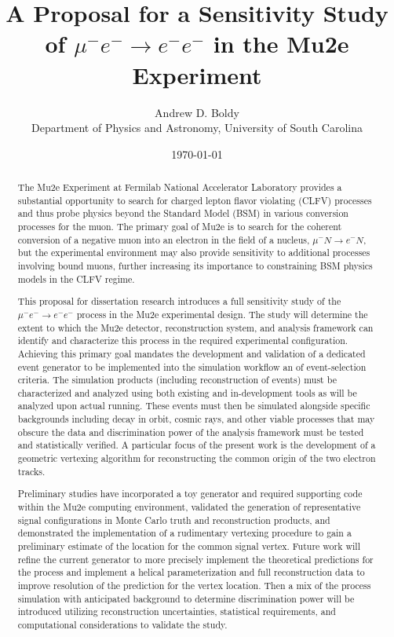 \documentclass[12pt]{article}
\title{A Proposal for a Sensitivity Study of
$\mu^- e^- \rightarrow e^-e^-$ in the Mu2e Experiment}
\author{
Andrew D. Boldy \\
\small Department of Physics and Astronomy, University of South Carolina
}
\date{\today}
\newcommand{\muEtoEE}{\mu^- e^- \to e^- e^-}
\newcommand{\muToe}{\mu^- N \to e^- N}
\begin{document}
\setlength{\droptitle}{-2cm}
\maketitle
\setlength{\droptitle}{0pt}
\begin{abstract}

The Mu2e Experiment at Fermilab National Accelerator Laboratory provides a substantial opportunity to search for charged lepton flavor violating (CLFV) processes and thus probe physics beyond the Standard Model (BSM) in various conversion processes for the muon. The primary goal of Mu2e is to search for the coherent conversion of a negative muon into an electron in the field of a nucleus, $\muToe$, but the experimental environment may also provide sensitivity to additional processes involving bound muons, further increasing its importance to constraining BSM physics models in the CLFV regime.

This proposal for dissertation research introduces a full sensitivity study of the $\muEtoEE$ process in the Mu2e experimental design. The study will determine the extent to which the Mu2e detector, reconstruction system, and analysis framework can identify and characterize this process in the required experimental configuration. Achieving this primary goal mandates the development and validation of a dedicated event generator to be implemented into the simulation workflow an of event-selection criteria. The simulation products (including reconstruction of events) must be characterized and analyzed using both existing and in-development tools as will be analyzed upon actual running. These events must then be simulated alongside specific backgrounds including decay in orbit, cosmic rays, and other viable processes that may obscure the data and discrimination power of the analysis framework must be tested and statistically verified. A particular focus of the present work is the development of a geometric vertexing algorithm for reconstructing the common origin of the two electron tracks. 

Preliminary studies have incorporated a toy generator and required supporting code within the Mu2e computing environment, validated the generation of representative signal configurations in Monte Carlo truth and reconstruction products, and demonstrated the implementation of a rudimentary vertexing procedure to gain a preliminary estimate of the location for the common signal vertex. Future work will refine the current generator to more precisely implement the theoretical predictions for the process and implement a helical parameterization and full reconstruction data to improve resolution of the prediction for the vertex location. Then a mix of the process simulation with anticipated background to determine discrimination power will be introduced utilizing reconstruction uncertainties, statistical requirements, and computational considerations to validate the study.


\end{abstract}
\end{document}
